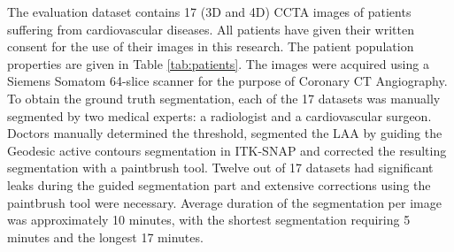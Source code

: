 \documentclass[review]{elsarticle}
\begin{document}



The evaluation dataset contains 17 (3D and 4D) CCTA images of patients
suffering from cardiovascular diseases. 
All patients have given their written consent for the use of their images in
this research.  The patient population properties are given in Table
\ref{tab:patients}.  The images were acquired using a Siemens Somatom 64-slice
scanner for the purpose of Coronary CT Angiography. To obtain the ground truth
segmentation, each of the 17 datasets was manually segmented by two medical
experts: a radiologist and a cardiovascular surgeon. 
Doctors manually determined the threshold, segmented the LAA by guiding the
Geodesic active contours segmentation in ITK-SNAP
\cite{yushkevich2006_Userguided3Dactive} and corrected the resulting
segmentation with a paintbrush tool.  Twelve out of 17 datasets had significant
leaks during the guided segmentation part and extensive corrections using the
paintbrush tool were necessary.  Average duration of the segmentation per image
was approximately 10 minutes, with the shortest segmentation requiring 5 minutes
and the longest 17 minutes.
\end{document}
